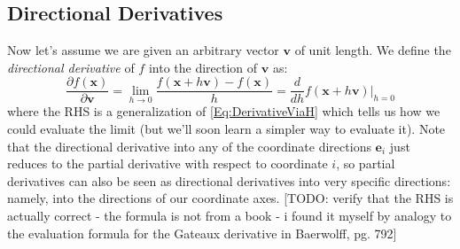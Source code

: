 \subsection{Directional Derivatives}
Now let's assume we are given an arbitrary vector $\mathbf{v}$ of unit length. We define the \emph{directional derivative} of $f$ into the direction of  $\mathbf{v}$ as:
\begin{equation}
\label{Eq:DirectionalDerivative}
 \frac{\partial f(\mathbf{x}) }{\partial \mathbf{v}} 
 = \lim_{h \rightarrow 0} \frac{f(\mathbf{x} + h \mathbf{v} ) - f(\mathbf{x})}{h}
 = \frac{d}{d h} f(\mathbf{x} + h \mathbf{v}) \bigg\rvert_{h=0}
\end{equation}
where the RHS is a generalization of \ref{Eq:DerivativeViaH} which tells us how we could evaluate the limit (but we'll soon learn a simpler way to evaluate it). Note that the directional derivative into any of the coordinate directions $\mathbf{e}_i$ just reduces to the partial derivative with respect to coordinate $i$, so partial derivatives can also be seen as directional derivatives into very specific directions: namely, into the directions of our coordinate axes. [TODO: verify that the RHS is actually correct - the formula is not from a book - i found it myself by analogy to the evaluation formula for the Gateaux derivative in Baerwolff, pg. 792]

